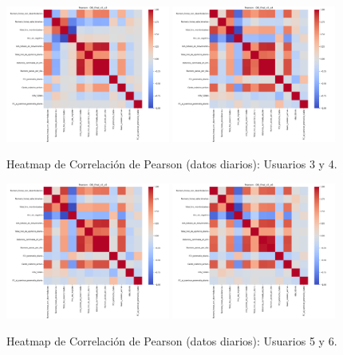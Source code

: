 \documentclass[12pt,letterpaper,twoside]{report}
\begin{document}
\begin{figure}[htbp]
\centering
\includegraphics[width=0.48\textwidth]{figuras/DB_final_v3_u3_heatmap_pearson.png}
\includegraphics[width=0.48\textwidth]{figuras/DB_final_v3_u4_heatmap_pearson.png}
\caption{Heatmap de Correlación de Pearson (datos diarios): Usuarios 3 y 4.}
\label{fig:corr_heatmap_u3_u4}
\end{figure}

\begin{figure}[htbp]
\centering
\includegraphics[width=0.48\textwidth]{figuras/DB_final_v3_u5_heatmap_pearson.png}
\includegraphics[width=0.48\textwidth]{figuras/DB_final_v3_u6_heatmap_pearson.png}
\caption{Heatmap de Correlación de Pearson (datos diarios): Usuarios 5 y 6.}
\label{fig:corr_heatmap_u5_u6}
\end{figure}
\end{document}
